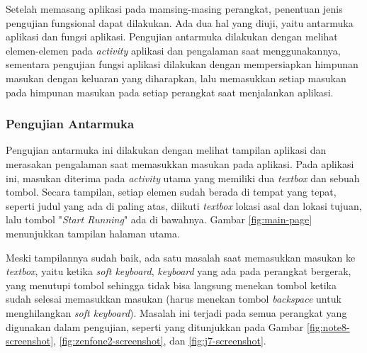 Setelah memasang aplikasi pada mamsing-masing perangkat, penentuan jenis pengujian fungsional dapat dilakukan. Ada dua hal yang diuji, yaitu antarmuka aplikasi dan fungsi aplikasi. Pengujian antarmuka dilakukan dengan melihat elemen-elemen pada \textit{activity} aplikasi dan pengalaman saat menggunakannya, sementara pengujian fungsi aplikasi dilakukan dengan mempersiapkan himpunan masukan dengan keluaran yang diharapkan, lalu memasukkan setiap masukan pada himpunan masukan pada setiap perangkat saat menjalankan aplikasi. 

\subsubsection{Pengujian Antarmuka}
Pengujian antarmuka ini dilakukan dengan melihat tampilan aplikasi dan merasakan pengalaman saat memasukkan masukan pada aplikasi. Pada aplikasi ini, masukan diterima pada \textit{activity} utama yang memiliki dua \textit{textbox} dan sebuah tombol. Secara tampilan, setiap elemen sudah berada di tempat yang tepat, seperti judul yang ada di paling atas, diikuti \textit{textbox} lokasi asal dan lokasi tujuan, lalu tombol "\textit{Start Running}" ada di bawahnya. Gambar \ref{fig:main-page} menunjukkan tampilan halaman utama.

Meski tampilannya sudah baik, ada satu masalah saat memasukkan masukan ke \textit{textbox}, yaitu ketika \textit{soft keyboard}, \textit{keyboard} yang ada pada perangkat bergerak, yang menutupi tombol sehingga tidak bisa langsung menekan tombol ketika sudah selesai memasukkan masukan (harus menekan tombol \textit{backspace} untuk menghilangkan \textit{soft keyboard}). Masalah ini terjadi pada semua perangkat yang digunakan dalam pengujian, seperti yang ditunjukkan pada Gambar \ref{fig:note8-screenshot}, \ref{fig:zenfone2-screenshot}, dan \ref{fig:j7-screenshot}.

